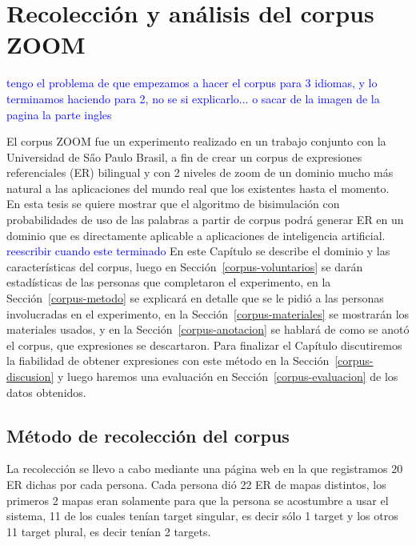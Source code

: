 \chapter{Recolecci\'on y an\'alisis del corpus ZOOM}
\label{sec:corpus}

\textcolor{blue}{tengo el problema de que empezamos a hacer el corpus para 3 idiomas, y lo terminamos haciendo para 2, no se si explicarlo... o sacar de la imagen de la pagina la parte ingles}

El corpus ZOOM fue un experimento realizado en un trabajo conjunto con la Universidad de S\H ao Paulo Brasil, a fin de crear un corpus de expresiones referenciales (ER) bilingual y con 2 niveles de zoom de un dominio mucho m\'as natural a las aplicaciones del mundo real que los existentes hasta el momento.\\

En esta tesis se quiere mostrar que el algoritmo de bisimulaci\'on con probabilidades de uso de las palabras a partir de corpus podr\'a generar ER en un dominio que es directamente aplicable a aplicaciones de inteligencia artificial.\\
\textcolor{blue}{reescribir cuando este terminado}
En este Cap\'itulo se describe el dominio y las caracter\'isticas del corpus, luego en Secci\'on~\ref{corpus-voluntarios} se dar\'an estad\'isticas de las personas que completaron el experimento, en la Secci\'on~\ref{corpus-metodo} se explicar\'a en detalle que se le pidi\'o a las personas involucradas en el experimento, en la Secci\'on~\ref{corpus-materiales} se mostrar\'an los materiales usados, y en la Secci\'on~\ref{corpus-anotacion} se hablar\'a de como se anot\'o el corpus, que expresiones se descartaron. Para finalizar el Cap\'itulo discutiremos la fiabilidad de obtener expresiones con este m\'etodo en la Secci\'on~\ref{corpus-discusion} y luego haremos una evaluaci\'on en Secci\'on~\ref{corpus-evaluacion} de los datos obtenidos.\\

\section{M\'etodo de recolecci\'on del corpus}


La recolecci\'on se llevo a cabo mediante una p\'agina web en la que registramos 20 ER dichas por cada persona. Cada persona di\'o 22 ER de mapas distintos, los primeros 2 mapas eran solamente para que la persona se acostumbre a usar el sistema, 11 de los cuales ten\'{i}an target singular, es decir s\'olo 1 target y los otros 11 target plural, es decir ten\'{i}an 2 targets.

